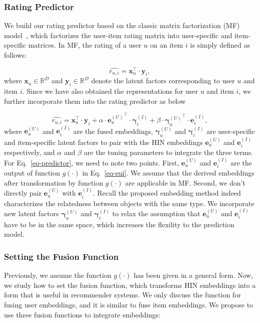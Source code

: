 \subsubsection{Rating Predictor}
We build our rating predictor based on the classic matrix factorization (MF) model~\cite{mnih2008probabilistic}, which factorizes the user-item rating matrix into user-specific and item-specific matrices. In MF, the rating of a user $u$ on an item $i$ is simply defined as follows:

\begin{equation}\label{eq-mf}
\widehat{r_{u,i}} = \mathbf{x}_u^{\top}\cdot \mathbf{y}_i,
\end{equation}
where $\mathbf{x}_u \in \mathbb{R}^{D}$ and $\mathbf{y}_i \in \mathbb{R}^{D}$ denote the latent factors corresponding to user $u$ and item $i$.
Since we have also obtained the representations for user $u$ and item $i$, we further incorporate them into the rating predictor as below

\begin{equation}\label{eq-predictor}
\widehat{r_{u,i}} = \mathbf{x}_u^{\top}\cdot \mathbf{y}_i + \alpha \cdot {\bm{e}_u^{(U)}}^{\top}\cdot\bm{{\gamma}}_i^{(I)}  + \beta \cdot {\bm{{\gamma}}^{(U)}_u}^{\top}\cdot {\bm{e}_i^{(I)}},
\end{equation}
where $\bm{e}_u^{(U)}$ and $\bm{e}_i^{(I)}$ are the fused embeddings,
$\bm{{\gamma}}^{(U)}_u$ and $\bm{{\gamma}}_i^{(I)}$ are user-specific and item-specific latent factors to pair with the HIN embeddings
$\bm{e}_u^{(U)}$ and $\bm{e}_i^{(I)}$ respectively, and $\alpha$ and $\beta$ are the tuning parameters to integrate the three terms.
For Eq.~\ref{eq-predictor}, we need to note two points. First, $\bm{e}_u^{(U)}$ and $\bm{e}_i^{(I)}$ are the output of function $g(\cdot)$ in Eq.~\ref{eq-eui}.
We assume that the derived embeddings after transformation by function $g(\cdot)$ are applicable
in MF. Second, we don't directly pair $\bm{e}_u^{(U)}$ with $\bm{e}_i^{(I)}$.
Recall the proposed embedding method indeed characterizes the relatedness between objects with the same type.
We incorporate new latent factors $\bm{{\gamma}}^{(U)}_u$ and $\bm{{\gamma}}_i^{(I)}$ to relax
the assumption that $\bm{e}_u^{(U)}$ and $\bm{e}_i^{(I)}$ have to be in the same space, which increases the flexility to the prediction model.

\subsubsection{Setting the Fusion Function}
Previously, we assume the function $g(\cdot)$ has been given in a general form.
Now, we study how to set the fusion function, which transforms HIN embeddings into a form that is useful in recommender systems.
We only discuss the function for fusing user embeddings, and it is similar to fuse item embeddings.
We propose to use three fusion functions to integrate embeddings:

